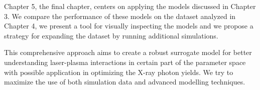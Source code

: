 Chapter 5, the final chapter, centers on applying the models discussed in Chapter 3. We compare the performance of these models on the dataset analyzed in Chapter 4, we present a tool for visually inspecting the models and we propose a strategy for expanding the dataset by running additional simulations.

This comprehensive approach aims to create a robust surrogate model for better understanding laser-plasma interactions in certain part of the parameter space with possible application in optimizing the X-ray photon yields.  We try to maximize the use of both simulation data and advanced modelling techniques.

